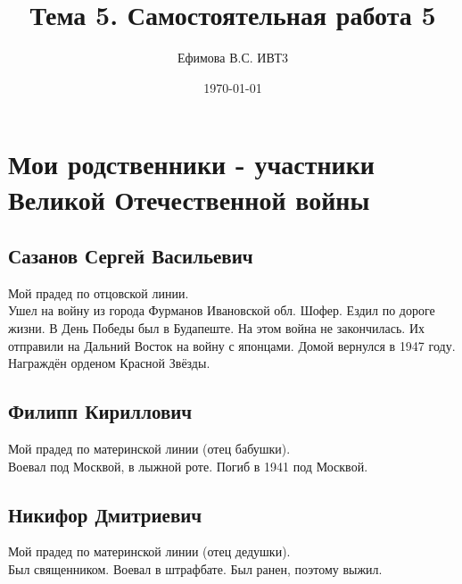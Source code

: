 \documentclass[a4paper,12pt]{article} %
\author{Ефимова В.С. ИВТ3}
\title{Тема 5. Самостоятельная работа 5}
\date{\today}
\begin{document}
\maketitle
\newpage
\section*{Мои родственники - участники Великой Отечественной войны}
\subsection*{Сазанов Сергей Васильевич}
Мой прадед по отцовской линии. \\
Ушел на войну из города Фурманов Ивановской обл. Шофер. Ездил по дороге жизни.
В День Победы был в Будапеште. На этом война не закончилась. Их отправили на Дальний Восток на войну с японцами. Домой вернулся в 1947 году. Награждён орденом Красной Звёзды.
\subsection*{Филипп Кириллович}
Мой прадед по материнской линии (отец бабушки).\\
Воевал под Москвой, в лыжной роте. Погиб в 1941 под Москвой.
\subsection*{Никифор Дмитриевич}
Мой прадед по материнской линии (отец дедушки).\\
Был священником. Воевал в штрафбате. Был ранен, поэтому выжил.
\end{document}
